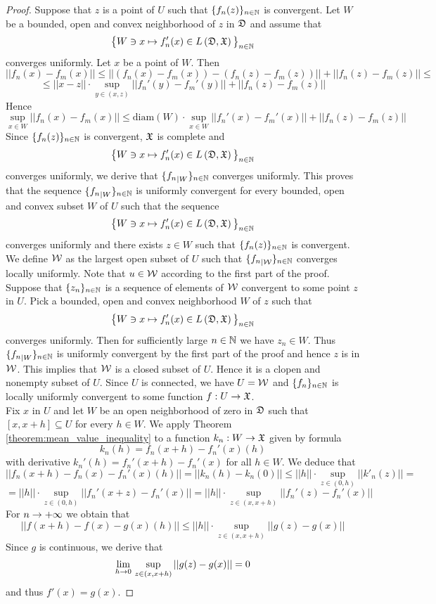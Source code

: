 \begin{proof}
Suppose that $z$ is a point of $U$ such that $\{f_n(z)\}_{n\in {\mathbb N}}$ is convergent. Let $W$ be a bounded, open and convex neighborhood of $z$ in ${\mathfrak D}$ and assume that
$$\big\{W\ni x \mapsto f_n'(x) \in L\left({\mathfrak D},{\mathfrak X}\right)\big\}_{n\in {\mathbb N}}$$
converges uniformly. Let $x$ be a point of $W$. Then
$$||f_n(x) - f_m(x)|| \leq ||\left(f_n(x) - f_m(x)\right) - \left(f_n(z) - f_m(z)\right)|| + ||f_n(z) - f_m(z)|| \leq$$
$$\leq ||x - z||\cdot \sup_{y\in (x,z)}\big|\big|f_n'\left(y\right) - f_m'\left(y\right)\big|\big| + ||f_n(z) - f_m(z)||$$
Hence
$$\sup_{x\in W}||f_n(x) - f_m(x)|| \leq \mathrm{diam}\left(W\right)\cdot \sup_{x\in W}\big|\big|f_n'\left(x\right) - f_m'\left(x\right)\big|\big| + ||f_n(z) - f_m(z)||$$
Since $\{f_n(z)\}_{n\in {\mathbb N}}$ is convergent, ${\mathfrak X}$ is complete and
$$\big\{W\ni x \mapsto f_n'(x) \in L\left({\mathfrak D},{\mathfrak X}\right)\big\}_{n\in {\mathbb N}}$$
converges uniformly, we derive that $\{{f_n}_{\mid W}\}_{n\in {\mathbb N}}$ converges uniformly. This proves that the sequence $\{{f_n}_{\mid W}\}_{n\in {\mathbb N}}$ is uniformly convergent for every bounded, open and convex subset $W$ of $U$ such that the sequence
$$\big\{W\ni x \mapsto f_n'(x) \in L\left({\mathfrak D},{\mathfrak X}\right)\big\}_{n\in {\mathbb N}}$$
converges uniformly and there exists $z \in W$ such that $\{f_n(z)\}_{n\in {\mathbb N}}$ is convergent.\\
We define ${\mathcal W}$ as the largest open subset of $U$ such that $\{{f_n}_{\mid {\mathcal W}}\}_{n\in {\mathbb N}}$ converges locally uniformly. Note that $u \in {\mathcal W}$ according to the first part of the proof. Suppose that $\{z_n\}_{n\in {\mathbb N}}$ is a sequence of elements of ${\mathcal W}$ convergent to some point $z$ in $U$. Pick a bounded, open and convex neighborhood $W$ of $z$ such that
$$\big\{W\ni x \mapsto f_n'(x) \in L\left({\mathfrak D},{\mathfrak X}\right)\big\}_{n\in {\mathbb N}}$$
converges uniformly. Then for sufficiently large $n\in {\mathbb N}$ we have $z_n \in W$. Thus $\{{f_n}_{\mid W}\}_{n\in {\mathbb N}}$ is uniformly convergent by the first part of the proof and hence $z$ is in ${\mathcal W}$. This implies that ${\mathcal W}$ is a closed subset of $U$. Hence it is a clopen and nonempty subset of $U$. Since $U$ is connected, we have $U = {\mathcal W}$ and $\{f_n\}_{n\in {\mathbb N}}$ is locally uniformly convergent to some function $f:U\rightarrow {\mathfrak X}$.\\
Fix $x$ in $U$ and let $W$ be an open neighborhood of zero in ${\mathfrak D}$ such that $[x,x+h]\subseteq U$ for every $h\in W$. We apply Theorem \ref{theorem:mean_value_inequality} to a function $k_n:W\rightarrow {\mathfrak X}$ given by formula
$$k_n(h) = f_n(x+h) - f_n'(x)(h)$$
with derivative $k_n'(h) = f_n'(x+h) - f_n'(x)$ for all $h\in W$. We deduce that
$$\big|\big|f_n(x+h) - f_n(x) - f_n'(x)(h)\big|\big| = ||k_n(h) - k_n(0)|| \leq ||h||\cdot \sup_{z\in (0,h)}||k'_n(z)|| =$$
$$= ||h||\cdot \sup_{z\in (0,h)}||f_n'(x+z) - f_n'(x)|| = ||h||\cdot \sup_{z\in (x,x+h)}||f_n'(z) - f_n'(x)||$$
For $n\rightarrow +\infty$ we obtain that
$$\big|\big|f(x+h) - f(x) - g(x)(h)\big|\big| \leq ||h||\cdot \sup_{z\in (x,x+h)}||g(z) - g(x)||$$
Since $g$ is continuous, we derive that 
$$\lim_{h\rightarrow 0}\,\sup_{z\in (x,x+h)}||g(z) - g(x)|| = 0$$
and thus $f'(x) = g(x)$.
\end{proof}


